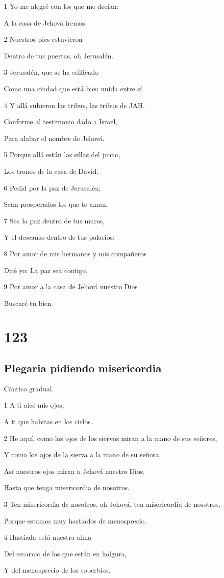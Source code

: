\par 1 Yo me alegré con los que me decían:
\par A la casa de Jehová iremos.
\par 2 Nuestros pies estuvieron
\par Dentro de tus puertas, oh Jerusalén.
\par 3 Jerusalén, que se ha edificado
\par Como una ciudad que está bien unida entre sí.
\par 4 Y allá subieron las tribus, las tribus de JAH,
\par Conforme al testimonio dado a Israel,
\par Para alabar el nombre de Jehová.
\par 5 Porque allá están las sillas del juicio,
\par Los tronos de la casa de David.
\par 6 Pedid por la paz de Jerusalén;
\par Sean prosperados los que te aman.
\par 7 Sea la paz dentro de tus muros,
\par Y el descanso dentro de tus palacios.
\par 8 Por amor de mis hermanos y mis compañeros
\par Diré yo: La paz sea contigo.
\par 9 Por amor a la casa de Jehová nuestro Dios
\par Buscaré tu bien.

\chapter{123}

\section*{Plegaria pidiendo misericordia}

\par Cántico gradual.

\par 1 A ti alcé mis ojos,
\par A ti que habitas en los cielos.
\par 2 He aquí, como los ojos de los siervos miran a la mano de sus señores,
\par Y como los ojos de la sierva a la mano de su señora,
\par Así nuestros ojos miran a Jehová nuestro Dios,
\par Hasta que tenga misericordia de nosotros.
\par 3 Ten misericordia de nosotros, oh Jehová, ten misericordia de nosotros,
\par Porque estamos muy hastiados de menosprecio.
\par 4 Hastiada está nuestra alma
\par Del escarnio de los que están en holgura,
\par Y del menosprecio de los soberbios.

